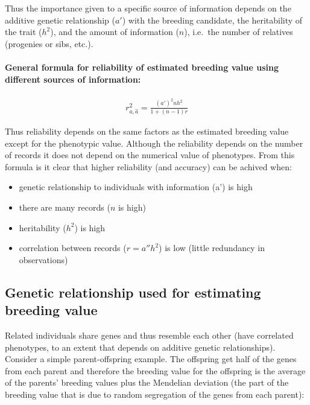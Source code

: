 \documentclass[
]{article}
\providecommand{\tightlist}{%
  \setlength{\itemsep}{0pt}\setlength{\parskip}{0pt}}
\begin{document}
Thus the importance given to a specific source of information depends on the additive genetic relationship (\(a'\)) with the breeding candidate, the heritability of the trait (\(h^2\)), and the amount of information (\(n\)), i.e.~the number of relatives (progenies or sibs, etc.).

\paragraph*{General formula for reliability of estimated breeding value using different sources of information:}\label{general-formula-for-reliability-of-estimated-breeding-value-using-different-sources-of-information}

\begin{align}
            r_{a,\hat{a}}^2=\frac{(a')^2nh^2}{1+(n-1)r}
\end{align}

Thus reliability depends on the same factors as the estimated breeding value except for the phenotypic value. Although the reliability depends on the number of records it does not depend on the numerical value of phenotypes. From this formula is it clear that higher reliability (and accuracy) can be achived when:

\begin{itemize}
\tightlist
\item
  genetic relationship to individuals with information (a') is high
\item
  there are many records (\(n\) is high)
\item
  heritability (\(h^2\)) is high
\item
  correlation between records (\(r = a''h^2\)) is low (little redundancy in observations)
\end{itemize}

\subsection{Genetic relationship used for estimating breeding value}\label{genetic-relationship-used-for-estimating-breeding-value}

Related individuals share genes and thus resemble each other (have correlated phenotypes, to an extent that depends on additive genetic relationships). Consider a simple parent-offspring example. The offspring get half of the genes from each parent and therefore the breeding value for the offspring is the average of the parents' breeding values plus the Mendelian deviation (the part of the breeding value that is due to random segregation of the genes from each parent):
\end{document}
